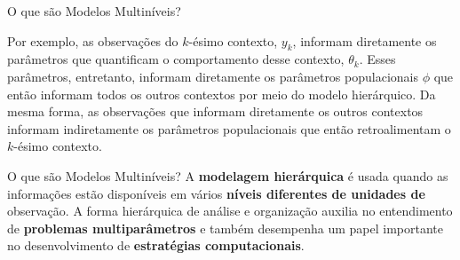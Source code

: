 \begin{frame}{O que são Modelos Multiníveis?}
\begin{adjustbox}{max width=1.0\textwidth}
        \end{adjustbox}

    \footnotesize
    Por exemplo, as observações do $k$-ésimo contexto, $y_k$, informam diretamente
    os parâmetros que quantificam o comportamento desse contexto, $\theta_k$.
    Esses parâmetros, entretanto, informam diretamente os parâmetros populacionais
    $\phi$ que então informam todos os outros contextos por meio do modelo hierárquico.
    Da mesma forma, as observações que informam diretamente os outros contextos
    informam indiretamente os parâmetros populacionais que então retroalimentam o $k$-ésimo
    contexto.
\end{frame}

\begin{frame}{O que são Modelos Multiníveis?}
    A \textbf{modelagem hierárquica} é usada quando as informações estão disponíveis em
    vários \textbf{níveis diferentes de unidades de} observação. A forma hierárquica de
    análise e organização auxilia no entendimento de \textbf{problemas multiparâmetros} e
    também desempenha um papel importante no desenvolvimento de \textbf{estratégias
    computacionais}.
\end{frame}

